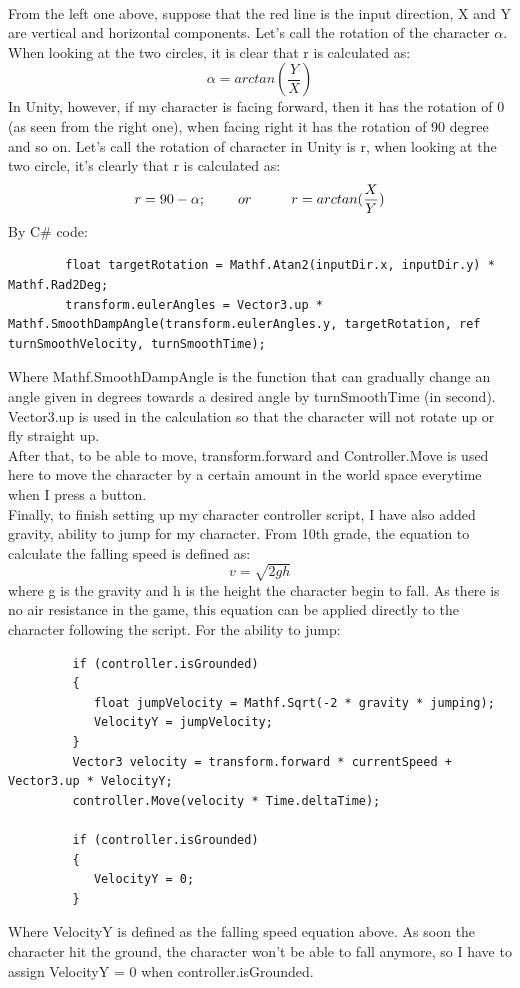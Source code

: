 \documentclass[a4paper, 13pt]{extarticle}
\begin{document}
 	 	\\[0.02cm]
 	 	From the left one above, suppose that the red line is the input direction, X and Y are vertical and horizontal components. Let's call the rotation of the character  {$\alpha$}. When looking at the two circles, it is clear that r is calculated as: 
 	 	\\[-0.5cm]
 	 	\[\alpha = arctan(\frac{Y}{X})\]
 	 	In Unity, however, if my character is facing forward, then it has the rotation of 0 (as seen from the right one), when facing right it has the rotation of 90 degree and so on. Let's call the rotation of character in Unity is r, when looking at the two circle, it's clearly that r is calculated as: \\[-0.5cm]
 	 	 \[r = 90 - \alpha; \hspace{0.8cm} or \hspace{1.0cm} r = arctan(\frac{X}{Y})\] 
 	 	By C\# code:
 	 	\begin{lstlisting}
 	 	float targetRotation = Mathf.Atan2(inputDir.x, inputDir.y) * Mathf.Rad2Deg;
 	 	transform.eulerAngles = Vector3.up * Mathf.SmoothDampAngle(transform.eulerAngles.y, targetRotation, ref turnSmoothVelocity, turnSmoothTime);
 	 	\end{lstlisting}
 	 	
 	 	Where Mathf.SmoothDampAngle is the function that can gradually change an angle given in degrees towards a desired angle by turnSmoothTime (in second). Vector3.up is used in the calculation so that the character will not rotate up or fly straight up.  \\[0.15cm] After that, to be able to move, transform.forward and Controller.Move is used here to move the character by a certain amount in the world space everytime when I press a button. \\[0.15cm] Finally, to finish setting up my character controller script, I have also added gravity, ability to jump for my character. From 10th grade, the equation to calculate the falling speed is defined as: 
 	 	\\[-0.5cm]
 	 	 \[v = \sqrt{2gh}\]
 	 	 where g is the gravity and h is the height the character begin to fall. As there is no air resistance in the game, this equation can be applied directly to the character following the script. For the ability to jump:
 	 	 \begin{lstlisting}
 	 	 if (controller.isGrounded)
 	 	 {
 	 	 	float jumpVelocity = Mathf.Sqrt(-2 * gravity * jumping);
 	 	 	VelocityY = jumpVelocity;
 	 	 }
 	 	 Vector3 velocity = transform.forward * currentSpeed + Vector3.up * VelocityY;
 	 	 controller.Move(velocity * Time.deltaTime);
 	 	 
 	 	 if (controller.isGrounded)
 	 	 {
 	 	 	VelocityY = 0;  
 	 	 }
 	 	 \end{lstlisting}
 	 	 Where VelocityY is defined as the falling speed equation above. As soon the character hit the ground, the character won't be able to fall anymore, so I have to assign VelocityY = 0 when controller.isGrounded. 
\end{document}
